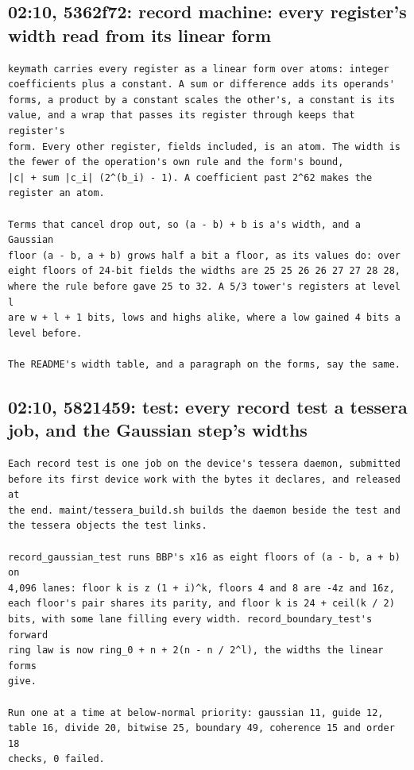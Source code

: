 \subsection{\texorpdfstring{02:10, 5362f72: record machine: every register's width read from its linear form}{02:10, 5362f72: record machine: every register's width read from its linear form}}

\begin{Verbatim}
keymath carries every register as a linear form over atoms: integer
coefficients plus a constant. A sum or difference adds its operands'
forms, a product by a constant scales the other's, a constant is its
value, and a wrap that passes its register through keeps that register's
form. Every other register, fields included, is an atom. The width is
the fewer of the operation's own rule and the form's bound,
|c| + sum |c_i| (2^(b_i) - 1). A coefficient past 2^62 makes the
register an atom.

Terms that cancel drop out, so (a - b) + b is a's width, and a Gaussian
floor (a - b, a + b) grows half a bit a floor, as its values do: over
eight floors of 24-bit fields the widths are 25 25 26 26 27 27 28 28,
where the rule before gave 25 to 32. A 5/3 tower's registers at level l
are w + l + 1 bits, lows and highs alike, where a low gained 4 bits a
level before.

The README's width table, and a paragraph on the forms, say the same.
\end{Verbatim}

\subsection{\texorpdfstring{02:10, 5821459: test: every record test a tessera job, and the Gaussian step's widths}{02:10, 5821459: test: every record test a tessera job, and the Gaussian step's widths}}

\begin{Verbatim}
Each record test is one job on the device's tessera daemon, submitted
before its first device work with the bytes it declares, and released at
the end. maint/tessera_build.sh builds the daemon beside the test and
the tessera objects the test links.

record_gaussian_test runs BBP's x16 as eight floors of (a - b, a + b) on
4,096 lanes: floor k is z (1 + i)^k, floors 4 and 8 are -4z and 16z,
each floor's pair shares its parity, and floor k is 24 + ceil(k / 2)
bits, with some lane filling every width. record_boundary_test's forward
ring law is now ring_0 + n + 2(n - n / 2^l), the widths the linear forms
give.

Run one at a time at below-normal priority: gaussian 11, guide 12,
table 16, divide 20, bitwise 25, boundary 49, coherence 15 and order 18
checks, 0 failed.
\end{Verbatim}

